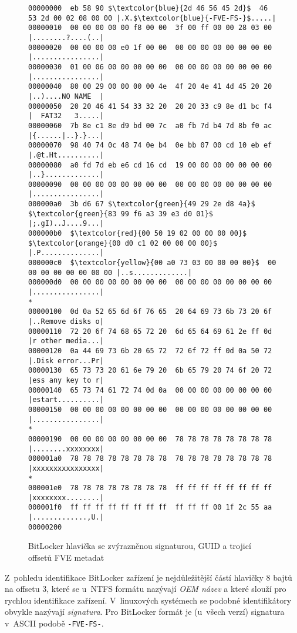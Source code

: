 \begin{figure}[h]
		\centering
		\captionsetup{width=0.65\linewidth}
\begin{lstlisting}[frame=none, escapechar=$, basicstyle=\ttfamily\small, columns=fullflexible, keepspaces=true]
00000000  eb 58 90 $\textcolor{blue}{2d 46 56 45 2d}$  46 53 2d 00 02 08 00 00 |.X.$\textcolor{blue}{-FVE-FS-}$.....|
00000010  00 00 00 00 00 f8 00 00  3f 00 ff 00 00 28 03 00 |........?....(..|
00000020  00 00 00 00 e0 1f 00 00  00 00 00 00 00 00 00 00 |................|
00000030  01 00 06 00 00 00 00 00  00 00 00 00 00 00 00 00 |................|
00000040  80 00 29 00 00 00 00 4e  4f 20 4e 41 4d 45 20 20 |..)....NO NAME  |
00000050  20 20 46 41 54 33 32 20  20 20 33 c9 8e d1 bc f4 |  FAT32   3.....|
00000060  7b 8e c1 8e d9 bd 00 7c  a0 fb 7d b4 7d 8b f0 ac |{......|..}.}...|
00000070  98 40 74 0c 48 74 0e b4  0e bb 07 00 cd 10 eb ef |.@t.Ht..........|
00000080  a0 fd 7d eb e6 cd 16 cd  19 00 00 00 00 00 00 00 |..}.............|
00000090  00 00 00 00 00 00 00 00  00 00 00 00 00 00 00 00 |................|
000000a0  3b d6 67 $\textcolor{green}{49 29 2e d8 4a}$  $\textcolor{green}{83 99 f6 a3 39 e3 d0 01}$ |;.gI)..J....9...|
000000b0  $\textcolor{red}{00 50 19 02 00 00 00 00}$  $\textcolor{orange}{00 d0 c1 02 00 00 00 00}$ |.P..............|
000000c0  $\textcolor{yellow}{00 a0 73 03 00 00 00 00}$  00 00 00 00 00 00 00 00 |..s.............|
000000d0  00 00 00 00 00 00 00 00  00 00 00 00 00 00 00 00 |................|
*
00000100  0d 0a 52 65 6d 6f 76 65  20 64 69 73 6b 73 20 6f |..Remove disks o|
00000110  72 20 6f 74 68 65 72 20  6d 65 64 69 61 2e ff 0d |r other media...|
00000120  0a 44 69 73 6b 20 65 72  72 6f 72 ff 0d 0a 50 72 |.Disk error...Pr|
00000130  65 73 73 20 61 6e 79 20  6b 65 79 20 74 6f 20 72 |ess any key to r|
00000140  65 73 74 61 72 74 0d 0a  00 00 00 00 00 00 00 00 |estart..........|
00000150  00 00 00 00 00 00 00 00  00 00 00 00 00 00 00 00 |................|
*
00000190  00 00 00 00 00 00 00 00  78 78 78 78 78 78 78 78 |........xxxxxxxx|
000001a0  78 78 78 78 78 78 78 78  78 78 78 78 78 78 78 78 |xxxxxxxxxxxxxxxx|
*
000001e0  78 78 78 78 78 78 78 78  ff ff ff ff ff ff ff ff |xxxxxxxx........|
000001f0  ff ff ff ff ff ff ff ff  ff ff ff 00 1f 2c 55 aa |.............,U.|
00000200
\end{lstlisting}
		\caption{BitLocker hlavička se zvýrazněnou signaturou, GUID a trojicí offsetů FVE metadat}
		\label{fig:bitlocker-header}
\end{figure}

Z~pohledu identifikace BitLocker zařízení je nejdůležitější částí hlavičky 8 bajtů na offsetu 3, které se u~NTFS formátu nazývají \emph{OEM název} a které slouží pro rychlou identifikace zařízení. V~linuxových systémech se podobné identifikátory obvykle nazývají \emph{signatura}\cite{Binnie2016}. Pro BitLocker formát je (u~všech verzí) signatura v~ASCII podobě \texttt{-FVE-FS-}\cite{Caseyc2010}.

